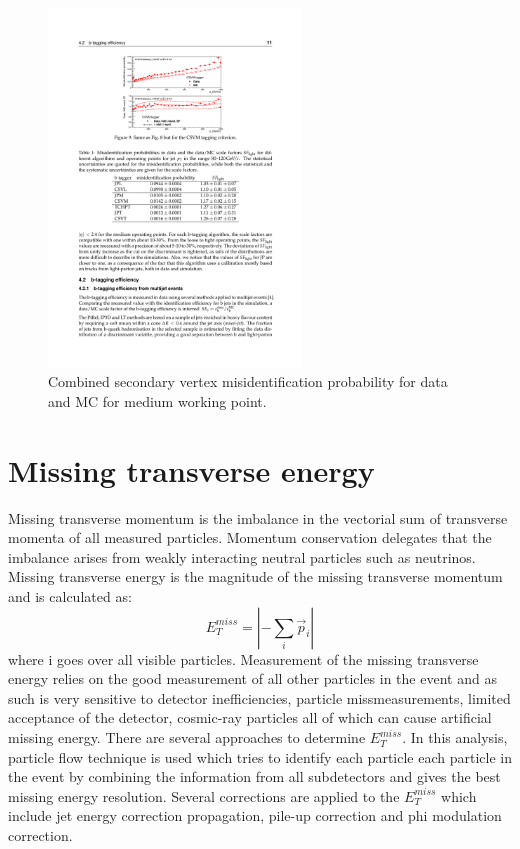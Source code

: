 \begin{figure}[ht]
\centering
	\includegraphics[width=0.6\textwidth]{Figures/MisID_CSVM.pdf}
	\caption{Combined secondary vertex misidentification probability for data and MC for medium working point.\cite{CMS:2013vea}}
	\label{fig:misID}
\end{figure}




\section{Missing transverse energy}

Missing transverse momentum is the imbalance in the vectorial sum of transverse momenta of all measured particles. Momentum conservation delegates that the imbalance arises from weakly interacting neutral particles such as neutrinos. Missing transverse energy is the magnitude of the missing transverse momentum and is calculated as:
\begin{equation}
E_T^{miss}= |-\sum_{i} \vec{p}_i|
\end{equation}
where i goes over all visible particles. Measurement of the missing transverse energy relies on the good measurement of all other particles in the event and as such is very sensitive to detector inefficiencies, particle missmeasurements, limited acceptance of the detector, cosmic-ray particles all of which can cause artificial missing energy. There are several approaches to determine $E_T^{miss}$. In this analysis, particle flow technique is used which tries to identify each particle each particle in the event by combining the information from all subdetectors and gives the best missing energy resolution.\cite{CMS-PAS-PFT-09-001,Chatrchyan:2011tn} Several corrections are applied to the $E_T^{miss}$ which include jet energy correction propagation, pile-up correction and phi modulation correction. 




